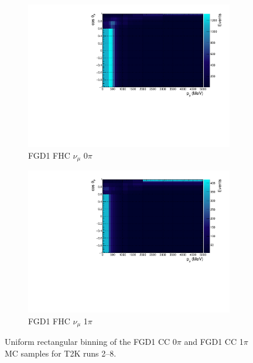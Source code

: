 \begin{figure}
\centering
\begin{subfigure}{.49\textwidth}
  \centering
  \includegraphics[width=0.95\linewidth]{figs/TH2D_MC_FGD1_numuCC_0pi}
  \caption{FGD1 FHC $\nu_{\mu}$ 0$\pi$}
  \label{fig:th2dFGD1_numuCC_0pi}
\end{subfigure}
\begin{subfigure}{.49\textwidth}
  \centering
  \includegraphics[width=0.95\linewidth]{figs/TH2D_MC_FGD1_numuCC_1pi}
  \caption{FGD1 FHC $\nu_{\mu}$ 1$\pi$}
  \label{fig:th2dFGD1_numuCC_1pi}
\end{subfigure}
\caption{Uniform rectangular binning of the FGD1 CC 0$\pi$ and FGD1 CC 1$\pi$ MC samples for T2K runs 2--8.}
\label{fig:th2dbin}
\end{figure}

